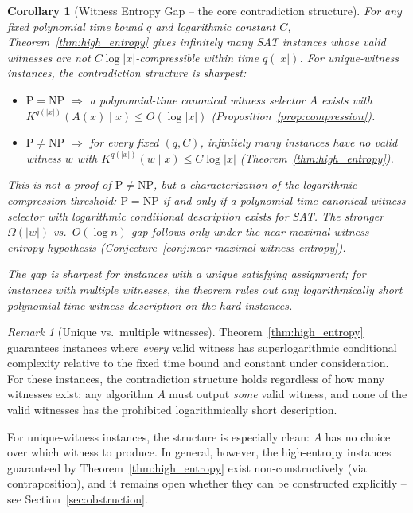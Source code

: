 \documentclass[aps,prd,twocolumn,superscriptaddress,nofootinbib]{revtex4-2}
\newtheorem{corollary}[theorem]{Corollary}
\theoremstyle{definition}
\theoremstyle{remark}
\newtheorem{remark}[theorem]{Remark}
\newcommand{\NP}{\mathrm{NP}}
\newcommand{\PP}{\mathrm{P}}
\begin{document}
\begin{corollary}[Witness Entropy Gap -- the core contradiction structure]
\label{cor:gap}
For any fixed polynomial time bound $q$ and logarithmic constant $C$, Theorem~\ref{thm:high_entropy} gives infinitely many SAT instances whose valid witnesses are not $C\log |x|$-compressible within time $q(|x|)$. For unique-witness instances, the contradiction structure is sharpest:
\begin{itemize}
\item $\PP = \NP$ $\Rightarrow$ a polynomial-time canonical witness selector $A$ exists with $K^{q(|x|)}(A(x) \mid x) \leq O(\log |x|)$ (Proposition~\ref{prop:compression}).
\item $\PP \neq \NP$ $\Rightarrow$ for every fixed $(q,C)$, infinitely many instances have no valid witness $w$ with $K^{q(|x|)}(w \mid x) \leq C\log |x|$ (Theorem~\ref{thm:high_entropy}).
\end{itemize}
This is not a proof of $\PP \neq \NP$, but a characterization of the logarithmic-compression threshold: $\PP = \NP$ if and only if a polynomial-time canonical witness selector with logarithmic conditional description exists for SAT. The stronger $\Omega(|w|)$ vs.\ $O(\log n)$ gap follows only under the near-maximal witness entropy hypothesis (Conjecture~\ref{conj:near-maximal-witness-entropy}).

The gap is sharpest for instances with a unique satisfying assignment; for instances with multiple witnesses, the theorem rules out \emph{any} logarithmically short polynomial-time witness description on the hard instances.
\end{corollary}

\begin{remark}[Unique vs.\ multiple witnesses]
Theorem~\ref{thm:high_entropy} guarantees instances where \textit{every} valid witness has superlogarithmic conditional complexity relative to the fixed time bound and constant under consideration. For these instances, the contradiction structure holds regardless of how many witnesses exist: any algorithm $A$ must output \textit{some} valid witness, and none of the valid witnesses has the prohibited logarithmically short description.

For unique-witness instances, the structure is especially clean: $A$ has no choice over which witness to produce. In general, however, the high-entropy instances guaranteed by Theorem~\ref{thm:high_entropy} exist non-constructively (via contraposition), and it remains open whether they can be constructed explicitly -- see Section~\ref{sec:obstruction}.
\end{remark}
\end{document}
